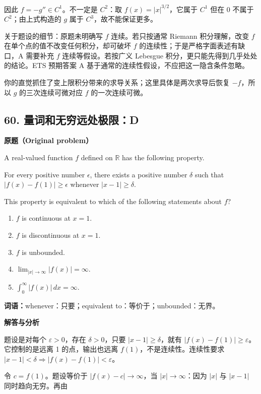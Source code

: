 \documentclass[11pt,a4paper,fontset=fandol]{ctexart}
\begin{document}
因此 \(f=-g''\in C^1\)。不一定是 \(C^2\)：取 \(f(x)=|x|^{3/2}\)，它属于
\(C^1\) 但在 0 不属于 \(C^2\)；由上式构造的 \(g\) 属于
\(C^3\)，故不能保证更多。

关于题设的细节：原题未明确写 \(f\) 连续。若只按通常 Riemann
积分理解，改变 \(f\) 在单个点的值不改变任何积分，却可破坏 \(f\)
的连续性；于是严格字面表述有缺口，A 需要补充 \(f\) 连续等假设。若按广义
Lebesgue 积分，更只能先得到几乎处处的结论。ETS 预期答案 A
基于通常的连续性假设，不应把这一隐含条件忽略。

你的直觉抓住了变上限积分带来的求导关系；这里具体是两次求导后恢复
\(-f\)，所以 \(g\) 的三次连续可微对应 \(f\) 的一次连续可微。

\hypertarget{ux91cfux8bcdux548cux65e0ux7a77ux8fdcux5904ux6781ux9650d}{%
\subsection{60.
量词和无穷远处极限：D}\label{ux91cfux8bcdux548cux65e0ux7a77ux8fdcux5904ux6781ux9650d}}

\textbf{原题（Original problem）}\par
A real-valued function $f$ defined on $\mathbb R$ has the following property.

For every positive number $\epsilon$, there exists a positive number $\delta$ such that $|f(x)-f(1)|\ge\epsilon$ whenever $|x-1|\ge\delta$.

This property is equivalent to which of the following statements about $f$?
\begin{enumerate}[label=(\Alph*)]
\item $f$ is continuous at $x=1$. \item $f$ is discontinuous at $x=1$. \item $f$ is unbounded. \item $\displaystyle\lim_{|x|\to\infty}|f(x)|=\infty$. \item $\displaystyle\int_0^\infty |f(x)|\,dx=\infty$.
\end{enumerate}
\textbf{词语：}whenever：只要；equivalent to：等价于；unbounded：无界。

\textbf{解答与分析}\par


题设是对每个 \(\varepsilon>0\)，存在 \(\delta>0\)，只要
\textbf{\(|x-1|\ge\delta\)}，就有
\textbf{\(|f(x)-f(1)|\ge\varepsilon\)}。它控制的是远离 1
的点，输出也远离 \(f(1)\)，不是连续性。连续性要求
\(|x-1|<\delta\Rightarrow|f(x)-f(1)|<\varepsilon\)。

令 \(c=f(1)\)。题设等价于 \(|f(x)-c|\to\infty\)，当
\(|x|\to\infty\)：因为 \(|x|\) 与 \(|x-1|\) 同时趋向无穷。再由
\end{document}
